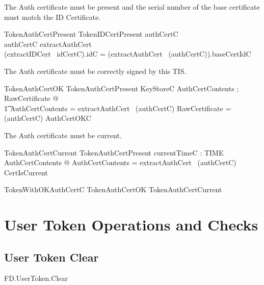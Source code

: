 The Auth certificate must be present and the serial number of the base certificate
must match the ID Certificate.

\begin{schema}{TokenAuthCertPresent}
        TokenIDCertPresent
\where
        authCertC \neq \Nil
\\      \The authCertC \in \dom extractAuthCert
\\      (extractIDCert~ idCertC).idC = (extractAuthCert~ (\The authCertC)).baseCertIdC   
\end{schema}

The Auth certificate must be correctly signed by this TIS.

\begin{schema}{TokenAuthCertOK}
        TokenAuthCertPresent
\also
        KeyStoreC
\where
        \exists AuthCertContents ; RawCertificate @ 
\\ \t1          \theta AuthCertContents = extractAuthCert~ (\The authCertC) 
                \land \theta RawCertificate = (\The authCertC) \land AuthCertOKC   
\end{schema}

The Auth certificate must be current.

\begin{schema}{TokenAuthCertCurrent}
        TokenAuthCertPresent
\also
        currentTimeC : TIME
\where
        \exists AuthCertContents  @ 
        \theta AuthCertContents = extractAuthCert~ (\The authCertC) 
           \land CertIsCurrent   
\end{schema}

\begin{zed}
        TokenWithOKAuthCertC  TokenAuthCertOK \land TokenAuthCertCurrent
\end{zed}


\section{User Token Operations and Checks}


\subsection{User Token Clear}

\begin{traceunit}{FD.UserToken.Clear}
\end{traceunit}


